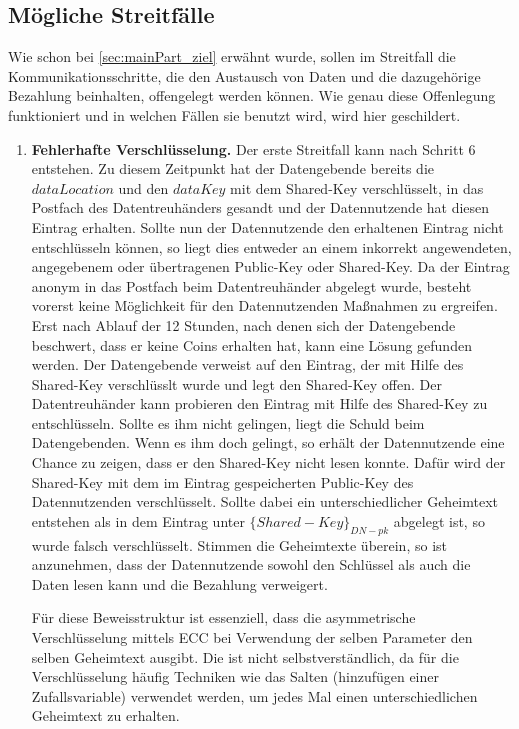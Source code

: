 \documentclass{scrreprt}
\begin{document}
\subsection{Mögliche Streitfälle}
\label{subsec:payStreit}
Wie schon bei \ref{sec:mainPart_ziel} erwähnt wurde, sollen im Streitfall die Kommunikationsschritte, die den Austausch von Daten und die dazugehörige Bezahlung beinhalten, offengelegt werden können. Wie genau diese Offenlegung funktioniert und in welchen Fällen sie benutzt wird, wird hier geschildert.\\

\begin{enumerate}
    \item \textbf{Fehlerhafte Verschlüsselung.}\label{case:IncorrectEncryption}
    Der erste Streitfall kann nach Schritt 6 entstehen. Zu diesem Zeitpunkt hat der Datengebende bereits die $dataLocation$ und den $dataKey$ mit dem Shared-Key verschlüsselt, in das Postfach des Datentreuhänders gesandt und der Datennutzende hat diesen Eintrag erhalten. Sollte nun der Datennutzende den erhaltenen Eintrag nicht entschlüsseln können, so liegt dies entweder an einem inkorrekt angewendeten, angegebenem oder übertragenen Public-Key oder Shared-Key. Da der Eintrag anonym in das Postfach beim Datentreuhänder abgelegt wurde, besteht vorerst keine Möglichkeit für den Datennutzenden Maßnahmen zu ergreifen. Erst nach Ablauf der 12 Stunden, nach denen sich der Datengebende beschwert, dass er keine Coins erhalten hat, kann eine Lösung gefunden werden. Der Datengebende verweist auf den Eintrag, der mit Hilfe des Shared-Key verschlüsslt wurde und legt den Shared-Key offen. Der Datentreuhänder kann probieren den Eintrag mit Hilfe des Shared-Key zu entschlüsseln. Sollte es ihm nicht gelingen, liegt die Schuld beim Datengebenden. Wenn es ihm doch gelingt, so erhält der Datennutzende eine Chance zu zeigen, dass er den Shared-Key nicht lesen konnte. Dafür wird der Shared-Key mit dem im Eintrag gespeicherten Public-Key des Datennutzenden verschlüsselt. Sollte dabei ein unterschiedlicher Geheimtext entstehen als in dem Eintrag unter $\{Shared-Key\}_{DN-pk}$ abgelegt ist, so wurde falsch verschlüsselt. Stimmen die Geheimtexte überein, so ist anzunehmen, dass der Datennutzende sowohl den Schlüssel als auch die Daten lesen kann und die Bezahlung verweigert. 

    Für diese Beweisstruktur ist essenziell, dass die asymmetrische Verschlüsselung mittels ECC bei Verwendung der selben Parameter den selben Geheimtext ausgibt. Die ist nicht selbstverständlich, da für die Verschlüsselung häufig Techniken wie das Salten (hinzufügen einer Zufallsvariable) verwendet werden, um jedes Mal einen unterschiedlichen Geheimtext zu erhalten.
    

\end{enumerate}
\end{document}
